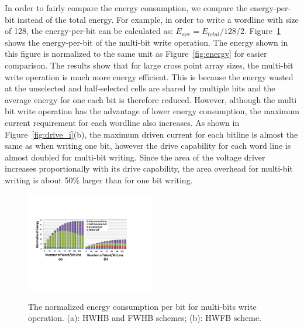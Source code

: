 In order to fairly compare the energy consumption, we compare the energy-per-bit instead of the total energy. For example, in order to write a wordline with size of 128, the energy-per-bit can be calculated as:
$E_{ave}=E_{total}/128/2$. Figure~\ref{fig:multi_energy} shows the energy-per-bit of the multi-bit write operation. The energy shown in this figure is normalized to the same unit as Figure~\ref{fig:energy} for easier comparison. The results show that for large cross point array sizes, the multi-bit write operation is much more energy efficient. This is because the energy wasted at the unselected and half-selected cells are shared by multiple bits and the average energy for one each bit is therefore reduced. However, although the multi bit write operation has the advantage of lower energy consumption, the maximum current requirement for each wordline also increases. As shown in Figure~\ref{fig:drive_i}(b), the maximum driven current for each bitline is almost the same as when writing one bit, however the drive capability for each word line is almost doubled for multi-bit writing. Since the area of the voltage driver increases proportionally with its drive capability, the area overhead for multi-bit writing is about 50\% larger than for one bit writing.

\begin{figure}%
\centering
  \includegraphics[width=0.5\textwidth]{./figures/multi_energy2.pdf}\\
  \caption{The normalized energy consumption per bit for multi-bits write operation. (a): HWHB and  FWHB schemes; (b): HWFB scheme. }\label{fig:multi_energy}
    \vspace{-10pt}
\end{figure}




